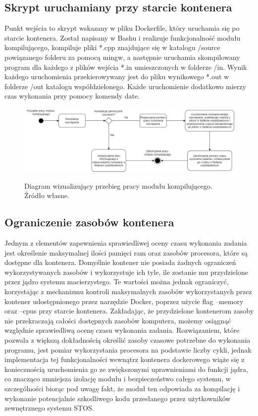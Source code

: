 \subsection{Skrypt uruchamiany przy starcie kontenera}
Punkt wejścia to skrypt wskazany w pliku Dockerfile, który uruchamia się po starcie kontenera. Został napisany w Bashu i realizuje funkcjonalność modułu kompilującego, kompiluje pliki *.cpp znajdujące się w katalogu /source powiązanego folderu za pomocą mingw, a następnie uruchamia skompilowany program dla każdego z plików wejścia *.in umieszczonych w folderze /in. Wynik każdego uruchomienia przekierowywany jest do  pliku wynikowego *.out w folderze /out katalogu współdzielonego. Każde uruchomienie dodatkowo mierzy czas wykonania przy pomocy komendy date.
\begin{figure}[!ht]
	\begin{center}
		\resizebox{1\textwidth}{!} {
			\includegraphics{img/3/diagram-aktywnosci-modul-kompilujacy.png}
		}
		\caption[Diagram aktywności modułu kompilującego]{Diagram wizualizujący przebieg pracy modułu kompilującego. Źródło własne.}
		\label{diagram-aktywnosci-worker}
	\end{center}
\end{figure}

\subsection{Ograniczenie zasobów kontenera}
Jednym z elementów zapewnienia sprawiedliwej oceny czasu wykonania zadania jest określenie maksymalnej ilości pamięci ram oraz zasobów procesora, które są dostępne dla kontenera. Domyślnie kontener nie posiada żadnych ograniczeń wykorzystywanych zasobów i wykorzystuje ich tyle, ile zostanie mu przydzielone przez jądro systemu macierzystego. Te wartości można jednak ograniczyć, korzystając z mechanizmu kontroli maksymalnych zasobów wykorzystanych przez kontener udostępnionego przez narzędzie Docker\cite{dockerConstraints}, poprzez użycie flag --memory oraz --cpus przy starcie kontenera. Zakładając, że przydzielone kontenerom zasoby nie przekraczają całości dostępnych zasobów komputera, możemy osiągnąć względnie sprawiedliwą ocenę czasu wykonania zadania. Rozwiązaniem, które pozwala z większą dokładnością określić zasoby czasowe potrzebne do wykonania programu, jest pomiar wykorzystania procesora na podstawie liczby cykli, jednak implementacja tej funkcjonalności wewnątrz kontenera dockerowego wiąże się z koniecznością uruchomienia go ze zwiększonymi uprawnieniami do funkcji jądra, co znacząco zmniejsza izolację modułu i bezpieczeństwo całego systemu, w szczególności biorąc pod uwagę fakt, że moduł ten odpowiada za kompilację i wykonanie potencjalnie szkodliwego kodu przesłanego przez użytkowników zewnętrznego systemu STOS.

